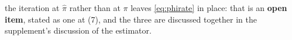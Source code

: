 \begin{definition}
{the iteration at $\hat\pi$ rather than at $\pi$ leaves \eqref{eq:phirate} in place}: that is an
\textbf{open item}, stated as one at \textup{(7)}, and the three are
discussed together in the supplement's discussion of the estimator.


\end{definition}
